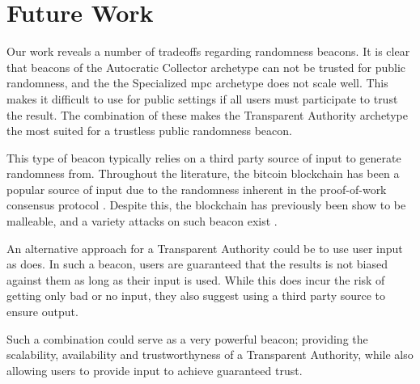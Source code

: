 \section{Future Work}\label{sec:future_work}
Our work reveals a number of tradeoffs regarding randomness beacons. It is clear that beacons of the Autocratic Collector archetype can not be trusted for public randomness, and the the Specialized \gls{mpc} archetype does not scale well. This makes it difficult to use for public settings if all users must participate to trust the result. The combination of these makes the Transparent Authority archetype  the most suited for a trustless public randomness beacon. 

This type of beacon typically relies on a third party source of input to generate randomness from. Throughout the literature, the bitcoin blockchain has been a popular source of input due to the randomness inherent in the proof-of-work consensus protocol \cite{bonneau2015bitcoin}. Despite this, the blockchain has previously been show to be malleable, and a variety attacks on such beacon exist \cite{bonneau2015bitcoin, bentov2016bitcoin, pierrot2016malleability}. 

An alternative approach for a Transparent Authority could be to use user input as  does. In such a beacon, users are guaranteed that the results is not biased against them as long as their input is used. While this does incur the risk of getting only bad or no input, they also suggest using a third party source to ensure output. 

Such a combination could serve as a very powerful beacon; providing the scalability, availability and trustworthyness of a Transparent Authority, while also allowing users to provide input to achieve guaranteed trust. 